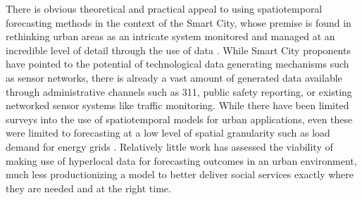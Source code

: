There is obvious theoretical and practical appeal to using spatiotemporal forecasting methods in the context of the Smart City, whose premise is found in rethinking urban areas as an intricate system monitored and managed at an incredible level of detail through the use of data \cite{kitchin_2014}. While Smart City proponents have pointed to the potential of technological data generating mechanisms such as sensor networks, there is already a vast amount of generated data available through administrative channels such as 311, public safety reporting, or existing networked sensor systems like traffic monitoring. While there have been limited surveys into the use of spatiotemporal models for urban applications, even these were limited to forecasting at a low level of spatial granularity such as load demand for energy grids \cite{tascikaraoglu_2017}. Relatively little work has assessed the viability of making use of hyperlocal data for forecasting outcomes in an urban environment, much less productionizing a model to better deliver social services exactly where they are needed and at the right time.
